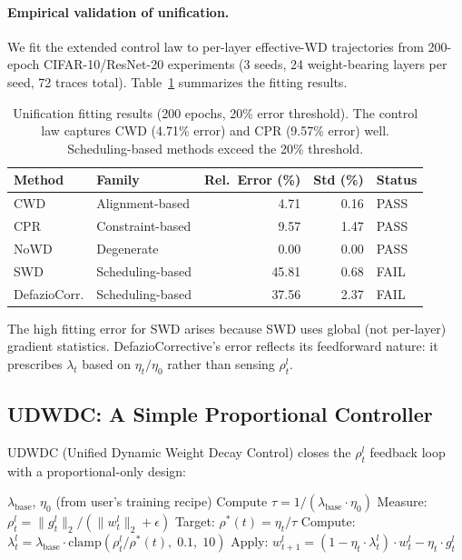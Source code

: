 \documentclass{article}
\begin{document}
\paragraph{Empirical validation of unification.}
We fit the extended control law to per-layer effective-WD trajectories from 200-epoch CIFAR-10/ResNet-20 experiments (3 seeds, 24 weight-bearing layers per seed, 72 traces total). Table~\ref{tab:fitting} summarizes the fitting results.

\begin{table}[t]
\caption{Unification fitting results (200 epochs, 20\% error threshold). The control law captures CWD (4.71\% error) and CPR (9.57\% error) well. Scheduling-based methods exceed the 20\% threshold.}
\label{tab:fitting}
\centering
\begin{tabular}{llrrl}
\toprule
Method & Family & Rel.\ Error (\%) & Std (\%) & Status \\
\midrule
CWD & Alignment-based & 4.71 & 0.16 & PASS \\
CPR & Constraint-based & 9.57 & 1.47 & PASS \\
NoWD & Degenerate & 0.00 & 0.00 & PASS \\
SWD & Scheduling-based & 45.81 & 0.68 & FAIL \\
DefazioCorr. & Scheduling-based & 37.56 & 2.37 & FAIL \\
\bottomrule
\end{tabular}
\end{table}

The high fitting error for SWD arises because SWD uses global (not per-layer) gradient statistics. DefazioCorrective's error reflects its feedforward nature: it prescribes $\lambda_t$ based on $\eta_t / \eta_0$ rather than sensing $\rho_t^l$.

\subsection{UDWDC: A Simple Proportional Controller}

UDWDC (Unified Dynamic Weight Decay Control) closes the $\rho_t^l$ feedback loop with a proportional-only design:

\begin{algorithm}[t]
\caption{UDWDC}
\label{alg:udwdc}
\begin{algorithmic}[1]
\REQUIRE $\lambda_{\text{base}}$, $\eta_0$ (from user's training recipe)
\STATE Compute $\tau = 1 / (\lambda_{\text{base}} \cdot \eta_0)$
  \STATE Measure: $\rho_t^l = \|g_t^l\|_2 / (\|w_t^l\|_2 + \epsilon)$
  \STATE Target: $\rho^*(t) = \eta_t / \tau$
  \STATE Compute: $\lambda_t^l = \lambda_{\text{base}} \cdot \text{clamp}(\rho_t^l / \rho^*(t),\; 0.1,\; 10)$
  \STATE Apply: $w_{t+1}^l = (1 - \eta_t \cdot \lambda_t^l) \cdot w_t^l - \eta_t \cdot g_t^l$
\ENDFOR
\end{algorithmic}
\end{algorithm}
\end{document}
